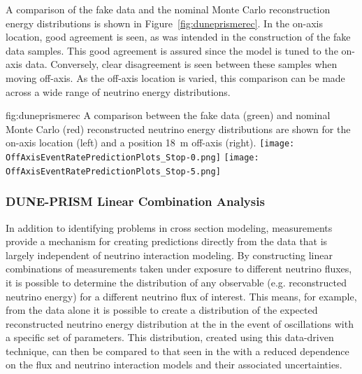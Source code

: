 A comparison of the fake data and the nominal Monte Carlo reconstruction energy distributions is shown in Figure~\ref{fig:duneprismerec}. In the on-axis location, good agreement is seen, as was intended in the construction of the fake data samples. This good agreement is assured since the model is tuned to the on-axis data.  Conversely, clear disagreement is seen between these samples when moving off-axis. As the off-axis location is varied, this comparison can be made across a wide range of neutrino energy distributions.


\begin{dunefigure}{fig:duneprismerec}
{A comparison between the fake data (green) and nominal Monte Carlo (red) reconstructed neutrino energy distributions are shown for the on-axis   location (left) and a position \SI{18}{m} off-axis (right).}
      \texttt{[image: OffAxisEventRatePredictionPlots\_Stop-0.png]}
      \texttt{[image: OffAxisEventRatePredictionPlots\_Stop-5.png]}
\end{dunefigure}

\subsubsection{DUNE-PRISM Linear Combination Analysis}

In addition to identifying problems in cross section modeling,  measurements provide a mechanism for creating   predictions directly from the   data that is largely independent of neutrino interaction modeling. By constructing linear combinations of measurements taken under exposure to different neutrino fluxes, it is possible to determine the distribution of any observable (e.g. reconstructed neutrino energy) for a different neutrino flux of interest. This means, for example, from the  data alone it is possible to create a distribution of the expected reconstructed neutrino energy distribution at the  in the event of oscillations with a specific set of parameters.  This distribution, created using this data-driven technique, can then be compared to that seen in the  with a reduced dependence on the flux and neutrino interaction models and their associated uncertainties.




